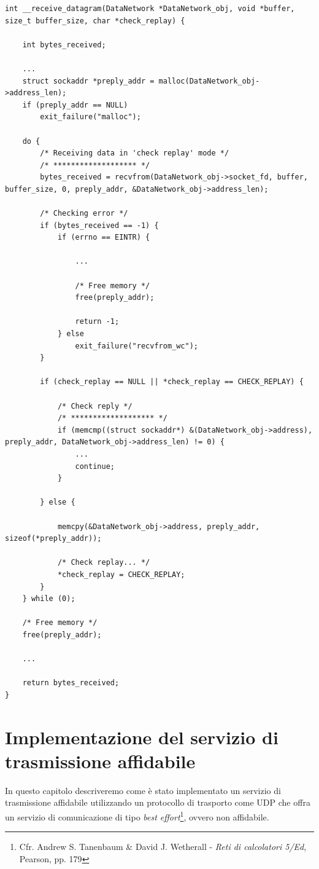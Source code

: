 \documentclass[10pt,a4paper, titlepage]{report}
\begin{document}
\begin{lstlisting}[frame=lines, caption={Implementazione della funzione \_\_receive\_datagram}, label={code:receiveDatagram}]
int __receive_datagram(DataNetwork *DataNetwork_obj, void *buffer, size_t buffer_size, char *check_replay) {

	int bytes_received;

	...
	struct sockaddr *preply_addr = malloc(DataNetwork_obj->address_len);
	if (preply_addr == NULL)
		exit_failure("malloc");

	do {
		/* Receiving data in 'check replay' mode */
		/* ******************* */
		bytes_received = recvfrom(DataNetwork_obj->socket_fd, buffer, buffer_size, 0, preply_addr, &DataNetwork_obj->address_len);

		/* Checking error */
		if (bytes_received == -1) {
			if (errno == EINTR) {

				...

				/* Free memory */
				free(preply_addr);

				return -1;
			} else
				exit_failure("recvfrom_wc");
		}

		if (check_replay == NULL || *check_replay == CHECK_REPLAY) {

			/* Check reply */
			/* ******************* */
			if (memcmp((struct sockaddr*) &(DataNetwork_obj->address), preply_addr, DataNetwork_obj->address_len) != 0) {
				...
				continue;
			}

		} else {

			memcpy(&DataNetwork_obj->address, preply_addr, sizeof(*preply_addr));

			/* Check replay... */
			*check_replay = CHECK_REPLAY;
		}
	} while (0);

	/* Free memory */
	free(preply_addr);

	...

	return bytes_received;
}
\end{lstlisting}

\newpage
\section{Implementazione del servizio di trasmissione affidabile}

In questo capitolo descriveremo come è stato implementato un servizio di trasmissione affidabile utilizzando un protocollo di trasporto come UDP che offra un servizio di comunicazione di tipo \textit{best effort}\footnote{Cfr. Andrew S. Tanenbaum \& David J. Wetherall - \textit{Reti di calcolatori 5/Ed}, Pearson, pp. 179}, ovvero non affidabile.
\end{document}
